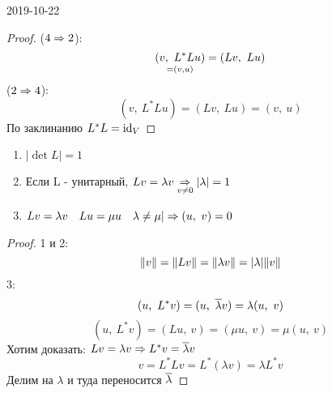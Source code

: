 \documentclass[main]{subfiles}
\begin{document}
\begin{lect} {2019-10-22}
		\begin{proof}
			($4 \Rightarrow 2$):
			\[\underset{=(v,u)}{(v,\ L^*Lu)} = (Lv,\ Lu)\]
			($2 \Rightarrow 4$):
			\[(v,\ L^* L u) = (Lv,\ Lu) = (v,\ u) \]
			По заклинанию $L^*L = \mathop{\rm id}\nolimits_V$
		\end{proof}

		\begin{utv}
			\begin{enumerate}
				\item $|\det L| = 1$
				\item Если L - унитарный, $Lv = \lambda v \underset{v \neq 0}{\Rightarrow} |\lambda| = 1$
				\item $Lv = \lambda v \quad Lu = \mu u \quad \lambda \neq \mu | \Rightarrow (u,\ v) = 0$
			\end{enumerate}
		\end{utv}

		\begin{proof}
			1 и 2:
			\[\lVert v \rVert = \lVert Lv \rVert = \lVert \lambda v \rVert = |\lambda| \lVert v \rVert\]
			3:
			\[(u,\ L^* v) = (u,\ \ol{\lambda} v) = \lambda (u,\ v)\]
			\[(u,\ L^* v) = (Lu,\ v) = (\mu u,\ v) = \mu(u,\ v)\]
			Хотим доказать: $Lv = \lambda v \Rightarrow L^* v = \overline{\lambda} v$
			\[v = L^* L v = L^* (\lambda v) = \lambda L^* v\]
			Делим на $\lambda$ и туда переносится $\overline{\lambda}$

		\end{proof}
	\end{lect}
\end{document}
